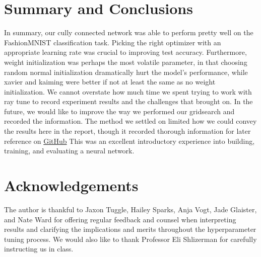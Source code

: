 \documentclass[11pt]{amsart}
\begin{document}
\section{Summary and Conclusions}\label{sec:conclusions} 
In summary, our cully connected network was able to perform pretty well on the FashionMNIST classification task.
Picking the right optimizer with an appropriate learning rate was crucial to improving test accuracy.
Furthermore, weight initialization was perhaps the most volatile parameter, in that choosing random normal initialization dramatically hurt the model's performance, while xavier and kaiming were better if not at least the same as no weight initialization.
We cannot overstate how much time we spent trying to work with ray tune to record experiment results and the challenges that brought on.
In the future, we would like to improve the way we performed our gridsearch and recorded the information.
The method we settled on limited how we could convey the results here in the report, though it recorded thorough information for later reference on \href{https://github.com/hunter-lybbert/uw-central/blob/main/data_analysis/hw_04/experiments/experiments.json}{GitHub}
This was an excellent introductory experience into building, training, and evaluating a neural network.

\section*{Acknowledgements}
The author is thankful to Jaxon Tuggle, Hailey Sparks, Anja Vogt, Jade Glaister, and Nate Ward for offering regular feedback and counsel when interpreting results and clarifying the implications and merits throughout the hyperparameter tuning process.
We would also like to thank Professor Eli Shlizerman for carefully instructing us in class.


\end{document}
